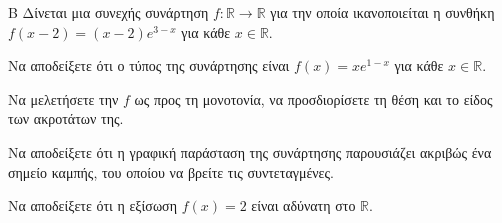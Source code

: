 \begin{thema}{Β}
Δίνεται μια συνεχής συνάρτηση $f: \mathbb{R} \to \mathbb{R}$ για την οποία ικανοποιείται η συνθήκη $f(x-2) = (x-2)e^{3-x}$ για κάθε  $x\in\mathbb{R}$.
\begin{erwthma}
  \item Να αποδείξετε ότι ο τύπος της συνάρτησης είναι $f(x) = x e^{1-x}$ για κάθε $x \in \mathbb{R}$.
  \item Να μελετήσετε την $f$ ως προς τη μονοτονία, να προσδιορίσετε τη θέση και το είδος των ακροτάτων της.
  \item Να αποδείξετε ότι η γραφική παράσταση της συνάρτησης παρουσιάζει ακριβώς ένα σημείο καμπής, του οποίου να βρείτε τις συντεταγμένες.
  \item Να αποδείξετε ότι η εξίσωση $f(x) = 2$ είναι αδύνατη στο $\mathbb{R}$.
\end{erwthma}
\end{thema}
